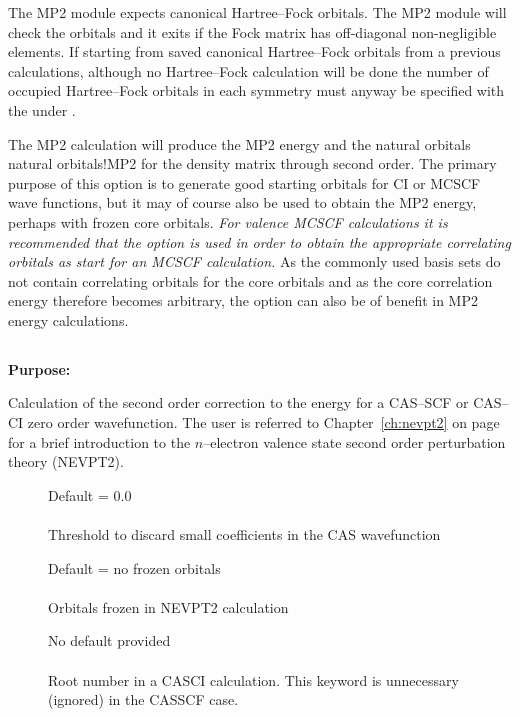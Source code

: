 The MP2 module expects canonical Hartree--Fock orbitals. The MP2 module will
check the orbitals and it exits if the Fock matrix has off-diagonal non-negligible
elements.
If starting from saved canonical Hartree--Fock orbitals from a previous calculations,
although no Hartree--Fock calculation will be done
the number of occupied Hartree--Fock orbitals in each symmetry must anyway be
specified with the  under .

The MP2 calculation will produce the MP2 energy and the natural orbitals
{natural orbitals!MP2}
for the density matrix through second order.  The primary purpose of
this option is to generate good starting orbitals for CI or MCSCF wave
functions, but it
may of course also be used to obtain the MP2 energy, perhaps with frozen
core orbitals. {\em For valence MCSCF calculations it is recommended that the
 option is used in order to obtain the appropriate
correlating orbitals as start
for an MCSCF calculation.\/}  As the commonly
used basis sets do not contain correlating orbitals for the core
orbitals and as the core correlation energy therefore becomes arbitrary,
the  option can also be of benefit in MP2 energy
calculations.

\pagebreak[3]
\subsection{\label{ref-nevpt2inp}}

{\bf Purpose:}

Calculation of the second order correction to the energy for a
CAS--SCF or CAS--CI zero order wavefunction.
The user is referred to Chapter~\ref{ch:nevpt2} on
page~\pageref{ch:nevpt2}  for a brief
introduction to the $n$--electron valence state second order
perturbation theory (NEVPT2).

\begin{description}
\item[]
 Default = 0.0\\
   \\
  Threshold to discard small coefficients in the CAS wavefunction

\item[]
  Default = no frozen orbitals\\
   \\
  Orbitals frozen in NEVPT2 calculation

\item[]
 No default provided\\
 \\
Root number in a CASCI calculation. This keyword is unnecessary
(ignored) in the CASSCF case.
\end{description}


